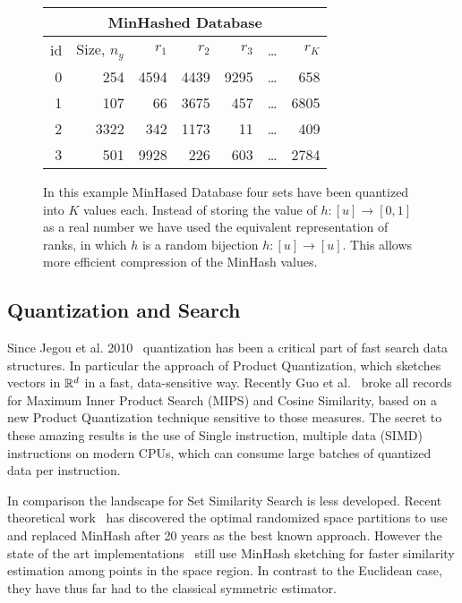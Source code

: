 \begin{figure}
\centering
 \begin{tabular}{|r|r| r r r r r|} 
 \hline
     \multicolumn{7}{|c|}{MinHashed Database} \\
 \hline
 id & Size, $n_y$  & $r_1$ & $r_2$ & $r_3$ & \dots & $r_K$ \\
 \hline
 0 & 254 & 4594 & 4439 & 9295 & \dots & 658  \\
 1 & 107 & 66 & 3675 & 457 &     \dots & 6805  \\
 2 & 3322 & 342 & 1173 & 11 &    \dots & 409  \\
 3 & 501 & 9928 & 226 & 603 &    \dots & 2784  \\
  \hline
 \end{tabular}
 \caption{In this example MinHased Database four sets have been quantized into $K$ values each.
    Instead of storing the value of $h:[u]\to[0,1]$ as a real number we have used the equivalent representation of ranks, in which $h$ is a random bijection $h:[u]\to[u]$.
    This allows more efficient compression of the MinHash values.
 }
 \label{tab:minhash-example}
\end{figure}





\subsection{Quantization and Search}

Since Jegou et al. 2010~\cite{jegou2010product} quantization has been a critical part of fast search data structures.
In particular the approach of Product Quantization, which sketches vectors in $\mathbb{R}^d$ in a fast, data-sensitive way.
Recently Guo et al.~\cite{guo2020accelerating} broke all records~\cite{aumuller2017ann} for Maximum Inner Product Search (MIPS) and Cosine Similarity, based on a new Product Quantization technique sensitive to those measures.
The secret to these amazing results is the use of Single instruction, multiple data (SIMD) instructions on modern CPUs, which can consume large batches of quantized data per instruction.

In comparison the landscape for Set Similarity Search is less developed.
Recent theoretical work~\cite{christiani2017set, DBLP:conf/focs/AhleK20} has discovered the optimal randomized space partitions to use and replaced MinHash after 20 years as the best known approach.
However the state of the art implementations~\cite{christiani2018scalable} still use MinHash sketching for faster similarity estimation among points in the space region.
In contrast to the Euclidean case, they have thus far had to the classical symmetric estimator.


